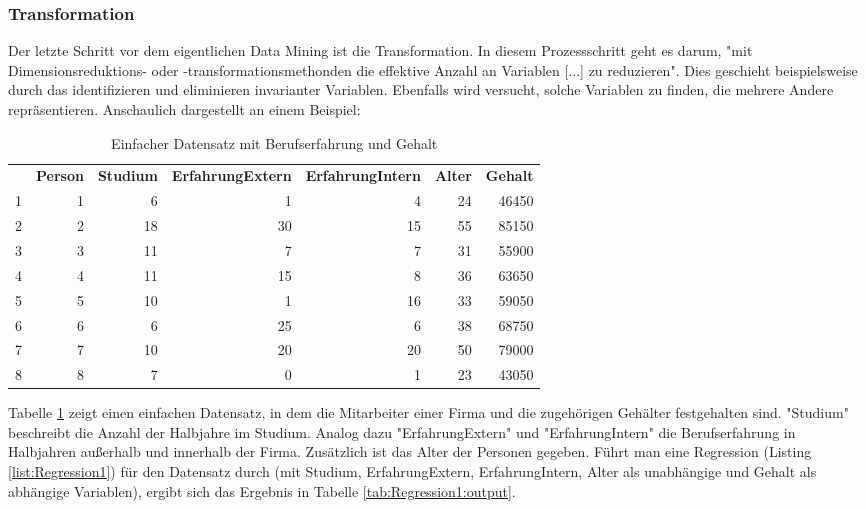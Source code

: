 \subsubsection{Transformation}
Der letzte Schritt vor dem eigentlichen Data Mining ist die Transformation. In diesem Prozessschritt geht es darum, "mit Dimensionsreduktions- oder -transformationsmethonden die effektive Anzahl an Variablen [...] zu reduzieren"\citep[S.~42; eigene Übersetzung]{fayyad_data_1996}. Dies geschieht beispielsweise durch das identifizieren und eliminieren invarianter Variablen. Ebenfalls wird versucht, solche Variablen zu finden, die mehrere Andere repräsentieren. Anschaulich dargestellt an einem Beispiel:\newline
\begin{table}[H]
\begin{tabular}{|rrrrrrr|}
  \hline
 & \textbf{Person} & \textbf{Studium} & \textbf{ErfahrungExtern} & \textbf{ErfahrungIntern} & \textbf{Alter} & \textbf{Gehalt} \\ 
\hhline{=======}
1 &   1 &   6 &   1 &   4 &  24 & 46450 \\ 
  2 &   2 &  18 &  30 &  15 &  55 & 85150 \\ 
  3 &   3 &  11 &   7 &   7 &  31 & 55900 \\ 
  4 &   4 &  11 &  15 &   8 &  36 & 63650 \\ 
  5 &   5 &  10 &   1 &  16 &  33 & 59050 \\ 
  6 &   6 &   6 &  25 &   6 &  38 & 68750 \\ 
  7 &   7 &  10 &  20 &  20 &  50 & 79000 \\ 
  8 &   8 &   7 &   0 &   1 &  23 & 43050 \\ 
   \hline
\end{tabular}
\caption{Einfacher Datensatz mit Berufserfahrung und Gehalt}
\label{tab:Beispiel_Berufserfahrung_R_output_simpleData}
\end{table}
Tabelle \ref{tab:Beispiel_Berufserfahrung_R_output_simpleData} zeigt einen einfachen Datensatz, in dem die Mitarbeiter einer Firma und die zugehörigen Gehälter festgehalten sind. "Studium" beschreibt die Anzahl der Halbjahre im Studium. Analog dazu "ErfahrungExtern" und "ErfahrungIntern" die Berufserfahrung in Halbjahren außerhalb und innerhalb der Firma. Zusätzlich ist das Alter der Personen gegeben.\newline
Führt man eine Regression (Listing \ref{list:Regression1}) für den Datensatz durch (mit Studium, ErfahrungExtern, ErfahrungIntern, Alter als unabhängige und Gehalt als abhängige Variablen), ergibt sich das Ergebnis in Tabelle \ref{tab:Regression1:output}.

